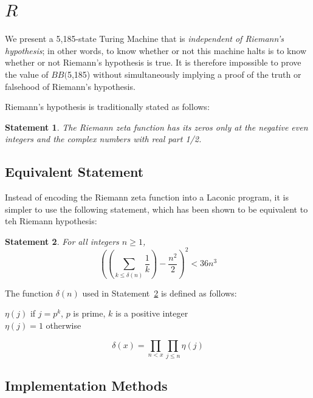 \documentclass[11pt]{article}
\newtheorem{statement}{Statement}
\newcommand{\rmstatenumstate}{5,185-state }
\newcommand{\bbrmstatenum}{$BB($5,185) }
\newenvironment{nscenter}
 {\parskip=0pt\par\nopagebreak\centering}
 {\par\noindent\ignorespacesafterend}
\begin{document}
  

\section{$R$}

We present a \rmstatenumstate Turing Machine that is \emph{independent of Riemann's hypothesis}; in other words, to know whether or not this machine halts is to know whether or not Riemann's hypothesis is true. It is therefore impossible to prove the value of \bbrmstatenum without simultaneously implying a proof of the truth or falsehood of Riemann's hypothesis.

Riemann's hypothesis is traditionally stated as follows:

\begin{statement}
\emph{The Riemann zeta function has its zeros only at the negative even integers and the complex numbers with real part 1/2.}
\label{goldbachstatement}
\end{statement}

\subsection{Equivalent Statement}

Instead of encoding the Riemann zeta function into a Laconic program, it is simpler to use the following statement, which has been shown to be equivalent to teh Riemann hypothesis:~\cite{riemann}\\

\begin{statement} \label{eq:riemann}
For all integers $n \ge 1$, 
$$\left(\left(\sum_{k \le \delta(n)} \frac{1}{k}\right) - \frac{n^2}{2}\right)^2 < 36n^3$$
\end{statement}

The function $\delta(n)$ used in Statement~\ref{eq:riemann} is defined as follows: \\

\begin{nscenter}
$\eta(j)$ if $j = p^k$, $p$ is prime, $k$ is a positive integer \\
$\eta(j) = 1$ otherwise
\end{nscenter}
$$\delta(x) = \prod_{n<x}\prod_{j \le n} \eta(j)$$

\subsection{Implementation Methods}
\end{document}

